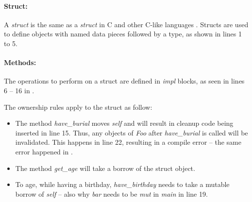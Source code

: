 \paragraph{Struct:}
A \textit{struct} is the same as a \textit{struct} in C \cite{stroustrup_13_01} and other C-like languages \cite{robinson_04_01,savitch_15_01,malik_09_01}.
Structs are used to define objects with named data pieces followed by a type, as shown in  lines 1 to 5.

\paragraph{Methods:}
The operations to perform on a struct are defined in \textit{impl} blocks, as seen in lines 6 -- 16 in .

The ownership rules apply to the struct as follow:
\begin{itemize}
	\item The method \textit{have\_burial} moves \textit{self} and will result in cleanup code being inserted in line 15.
	      Thus, any objects of \textit{Foo} after \textit{have\_burial} is called will be invalidated.
	      This happens in line 22, resulting in a compile error -- the same error happened in .
	\item The method \textit{get\_age} will take a borrow of the struct object.
	\item To age, while having a birthday, \textit{have\_birthday} needs to take a mutable borrow of \textit{self} -- also why \textit{bar} needs to be \textit{mut} in \textit{main} in line 19.
\end{itemize}


\addtocounter{footnote}{1}
\addtocounter{footnote}{1}
\addtocounter{footnote}{1}
\addtocounter{footnote}{1}

